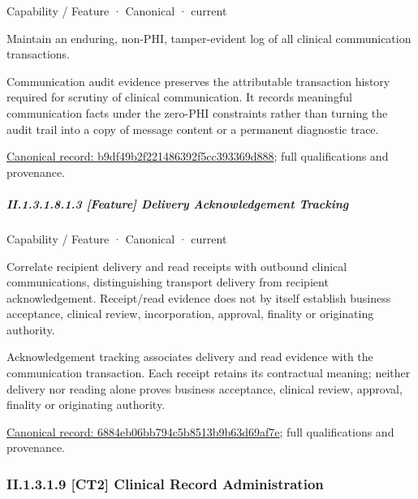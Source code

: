 \label{element:b9df49b2f221486392f5cc393369d888}
{\small Capability / Feature · Canonical · current}\par

Maintain an enduring, non-PHI, tamper-evident log of all clinical communication transactions.



Communication audit evidence preserves the attributable transaction history required for scrutiny of clinical communication. It records meaningful communication facts under the zero-PHI constraints rather than turning the audit trail into a copy of message content or a permanent diagnostic trace.


{\footnotesize \href{../../../../../../../continuum/strategy/capability/feature/b9df49b2f221486392f5cc393369d888.md}{Canonical record: b9df49b2f221486392f5cc393369d888}; full qualifications and provenance.}\par
\subparagraph*{II.1.3.1.8.1.3 [Feature] Delivery Acknowledgement Tracking}
\label{navigation:II.1.3.1.8.1.3}

\label{element:6884eb06bb794c5b8513b9b63d69af7e}
{\small Capability / Feature · Canonical · current}\par

Correlate recipient delivery and read receipts with outbound clinical communications, distinguishing transport delivery from recipient acknowledgement. Receipt/read evidence does not by itself establish business acceptance, clinical review, incorporation, approval, finality or originating authority.



Acknowledgement tracking associates delivery and read evidence with the communication transaction. Each receipt retains its contractual meaning; neither delivery nor reading alone proves business acceptance, clinical review, approval, finality or originating authority.


{\footnotesize \href{../../../../../../../continuum/strategy/capability/feature/6884eb06bb794c5b8513b9b63d69af7e.md}{Canonical record: 6884eb06bb794c5b8513b9b63d69af7e}; full qualifications and provenance.}\par
\subsubsection*{II.1.3.1.9 [CT2] Clinical Record Administration}
\label{navigation:II.1.3.1.9}

